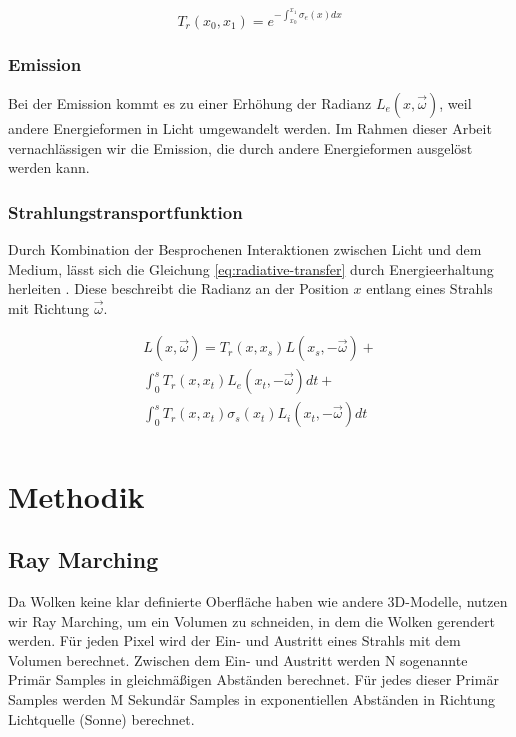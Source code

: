 \begin{equation}
    T_r(x_0, x_1) = e^{-\int_{x_0}^{x_1} \sigma_e(x) dx}
    \label{eq:transmittance}
\end{equation}

\subsubsection{Emission}
Bei der Emission kommt es zu einer Erhöhung der Radianz $ L_e(x, \vec{\omega}) $, weil andere Energieformen in Licht umgewandelt werden. Im Rahmen dieser Arbeit vernachlässigen wir die Emission, die durch andere Energieformen ausgelöst werden kann.

\subsubsection{Strahlungstransportfunktion}
Durch Kombination der Besprochenen Interaktionen zwischen Licht und dem Medium, lässt sich die Gleichung \ref{eq:radiative-transfer} durch Energieerhaltung herleiten \cite{Högfeldt16}. Diese beschreibt die Radianz an der Position $ x $ entlang eines Strahls mit Richtung $ \vec{\omega} $.

\begin{multline}
    L(x, \vec{\omega}) =
    T_r(x, x_s) L(x_s, -\vec{\omega}) +\\
    \int_{0}^{s} T_r(x, x_t) L_e(x_t, -\vec{\omega}) dt +\\
    \int_{0}^{s} T_r(x, x_t) \sigma_s(x_t) L_i(x_t, -\vec{\omega}) dt\\
    \label{eq:radiative-transfer}
\end{multline}

\section{Methodik}
\label{sec:method}

\subsection{Ray Marching}
Da Wolken keine klar definierte Oberfläche haben wie andere 3D-Modelle, nutzen wir Ray Marching, um ein Volumen zu schneiden, in dem die Wolken gerendert werden. Für jeden Pixel wird der Ein- und Austritt eines Strahls mit dem Volumen berechnet. Zwischen dem Ein- und Austritt werden N sogenannte Primär Samples in gleichmäßigen Abständen berechnet. Für jedes dieser Primär Samples werden M Sekundär Samples in exponentiellen Abständen in Richtung Lichtquelle (Sonne) berechnet.


